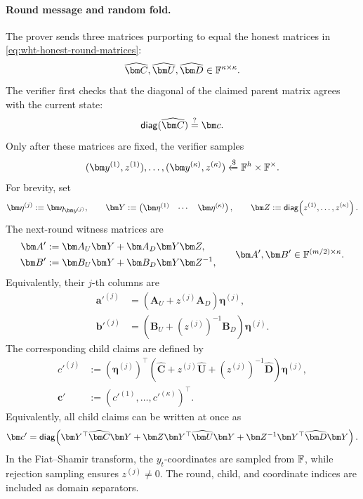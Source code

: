 \documentclass[runningheads]{llncs}
\begin{document}
\paragraph{Round message and random fold.}
The prover sends three matrices purporting to equal the honest
matrices in \eqref{eq:wht-honest-round-matrices}:
\[
    \widehat{\bm C},\widehat{\bm U},\widehat{\bm D}
      \in\Field^{\kappa\times\kappa}.
\]
The verifier first checks that the diagonal of the claimed parent
matrix agrees with the current state:
\begin{equation}
    \diag(\widehat{\bm C})\EqOrNot\bm c.
\label{eq:wht-parent-check}
\end{equation}
Only after these matrices are fixed, the verifier samples
\[
    (\bm y^{(1)},z^{(1)}),\ldots,
    (\bm y^{(\kappa)},z^{(\kappa)})
      \ChooseRandom\Field^h\times\Field^\times.
\]
For brevity, set
\[
    \bm\eta^{(j)}:=\bm\eta_{\bm y^{(j)}},
    \qquad
    \bm Y:=
      \begin{pmatrix}
        \bm\eta^{(1)}&\cdots&\bm\eta^{(\kappa)}
      \end{pmatrix},
    \qquad
    \bm Z:=\diag\!\left(
      z^{(1)},\ldots,z^{(\kappa)}
    \right).
\]
The next-round witness matrices are
\begin{equation}
\begin{aligned}
    \bm A'
      &:=
      \bm A_U\bm Y+\bm A_D\bm Y\bm Z,\\
    \bm B'
      &:=
      \bm B_U\bm Y+\bm B_D\bm Y\bm Z^{-1},
\end{aligned}
\qquad
    \bm A',\bm B'\in\Field^{(m/2)\times\kappa}.
\label{eq:wht-random-folds}
\end{equation}
Equivalently, their \(j\)-th columns are
\begin{equation}
\begin{aligned}
    \bm a'^{(j)}
      &=
      \left(\bm A_U+z^{(j)}\bm A_D\right)\bm\eta^{(j)},\\
    \bm b'^{(j)}
      &=
      \left(\bm B_U+(z^{(j)})^{-1}\bm B_D\right)\bm\eta^{(j)}.
\end{aligned}
\label{eq:wht-child-vectors}
\end{equation}
The corresponding child claims are defined by
\begin{equation}
\begin{aligned}
    c'^{(j)}
      &:=
      (\bm\eta^{(j)})^\top
      \left(
        \widehat{\bm C}
        +z^{(j)}\widehat{\bm U}
        +(z^{(j)})^{-1}\widehat{\bm D}
      \right)
      \bm\eta^{(j)},\\
    \bm c'
      &:=
      \left(c'^{(1)},\ldots,c'^{(\kappa)}\right)^\top.
\end{aligned}
\label{eq:wht-state-update}
\end{equation}
Equivalently, all child claims can be written at once as
\[
    \bm c'
      =
      \diag\!\left(
        \bm Y^\top\widehat{\bm C}\bm Y
        +\bm Z\bm Y^\top\widehat{\bm U}\bm Y
        +\bm Z^{-1}\bm Y^\top\widehat{\bm D}\bm Y
      \right).
\]
In the Fiat--Shamir transform, the \(y_t\)-coordinates are sampled
from \({\mathbb{F}}\), while rejection sampling ensures \(z^{(j)}\ne0\).
The round, child, and coordinate indices are included as domain
separators.
\end{document}
